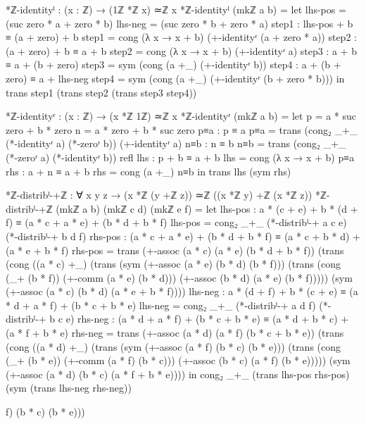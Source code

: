 \documentclass[11pt,a4paper]{book}
\begin{document}
\begin{code}
*ℤ-identityˡ : (x : ℤ) → (1ℤ *ℤ x) ≃ℤ x
*ℤ-identityˡ (mkℤ a b) = 
  let lhs-pos = (suc zero * a + zero * b)
      lhs-neg = (suc zero * b + zero * a)
      step1 : lhs-pos + b ≡ (a + zero) + b
      step1 = cong (λ x → x + b) (+-identityʳ (a + zero * a))
      step2 : (a + zero) + b ≡ a + b
      step2 = cong (λ x → x + b) (+-identityʳ a)
      step3 : a + b ≡ a + (b + zero)
      step3 = sym (cong (a +_) (+-identityʳ b))
      step4 : a + (b + zero) ≡ a + lhs-neg
      step4 = sym (cong (a +_) (+-identityʳ (b + zero * b)))
  in trans step1 (trans step2 (trans step3 step4))

*ℤ-identityʳ : (x : ℤ) → (x *ℤ 1ℤ) ≃ℤ x
*ℤ-identityʳ (mkℤ a b) = 
  let p = a * suc zero + b * zero
      n = a * zero + b * suc zero
      p≡a : p ≡ a
      p≡a = trans (cong₂ _+_ (*-identityʳ a) (*-zeroʳ b)) (+-identityʳ a)
      n≡b : n ≡ b
      n≡b = trans (cong₂ _+_ (*-zeroʳ a) (*-identityʳ b)) refl
      lhs : p + b ≡ a + b
      lhs = cong (λ x → x + b) p≡a
      rhs : a + n ≡ a + b
      rhs = cong (a +_) n≡b
  in trans lhs (sym rhs)

*ℤ-distribˡ-+ℤ : ∀ x y z → (x *ℤ (y +ℤ z)) ≃ℤ ((x *ℤ y) +ℤ (x *ℤ z))
*ℤ-distribˡ-+ℤ (mkℤ a b) (mkℤ c d) (mkℤ e f) = 
  let
      lhs-pos : a * (c + e) + b * (d + f) ≡ (a * c + a * e) + (b * d + b * f)
      lhs-pos = cong₂ _+_ (*-distribˡ-+ a c e) (*-distribˡ-+ b d f)
      rhs-pos : (a * c + a * e) + (b * d + b * f) ≡ (a * c + b * d) + (a * e + b * f)
      rhs-pos = trans (+-assoc (a * c) (a * e) (b * d + b * f))
                (trans (cong ((a * c) +_) (trans (sym (+-assoc (a * e) (b * d) (b * f)))
                                          (trans (cong (_+ (b * f)) (+-comm (a * e) (b * d)))
                                                 (+-assoc (b * d) (a * e) (b * f)))))
                       (sym (+-assoc (a * c) (b * d) (a * e + b * f))))
      lhs-neg : a * (d + f) + b * (c + e) ≡ (a * d + a * f) + (b * c + b * e)
      lhs-neg = cong₂ _+_ (*-distribˡ-+ a d f) (*-distribˡ-+ b c e)
      rhs-neg : (a * d + a * f) + (b * c + b * e) ≡ (a * d + b * c) + (a * f + b * e)
      rhs-neg = trans (+-assoc (a * d) (a * f) (b * c + b * e))
                (trans (cong ((a * d) +_) (trans (sym (+-assoc (a * f) (b * c) (b * e)))
                                          (trans (cong (_+ (b * e)) (+-comm (a * f) (b * c)))
                                                 (+-assoc (b * c) (a * f) (b * e)))))
                       (sym (+-assoc (a * d) (b * c) (a * f + b * e))))
  in cong₂ _+_ (trans lhs-pos rhs-pos) (sym (trans lhs-neg rhs-neg))
\end{code}f) (b * c) (b * e)))
\end{document}
